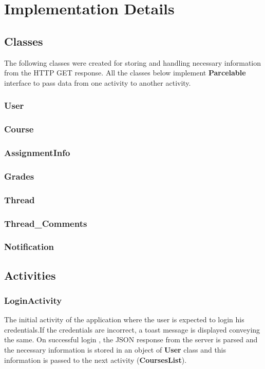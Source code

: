 \documentclass[12pt]{article}
\begin{document}
\section{Implementation Details}
\subsection{Classes}
The following classes were created for storing and handling necessary information from the HTTP GET response.
All the classes below implement \textbf{Parcelable}\cite{parcel} interface to pass data from one activity to another activity.
\subsubsection{User}
\subsubsection{Course}
\subsubsection{AssignmentInfo}
\subsubsection{Grades}
\subsubsection{Thread}
\subsubsection{Thread\_Comments}
\subsubsection{Notification}

\subsection{Activities}

\subsubsection{LoginActivity}
The initial activity of the application where the user is expected to login his credentials.If the credentials are incorrect, a toast message is displayed conveying the same. On successful login , the JSON response from the server is parsed and the necessary information is stored in an object of \textbf{User} class and this information is passed to the next activity (\textbf{CoursesList}). 
\end{document}
